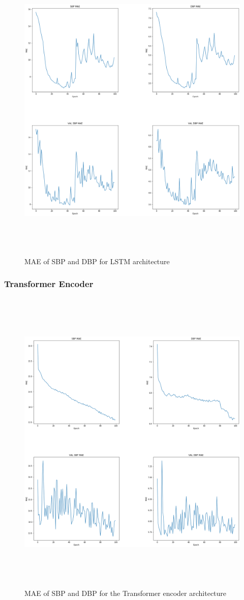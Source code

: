 \begin{figure}[H]
    \centering
    \includegraphics[width=15cm,height=15cm,keepaspectratio]{Results/lstm.png}
    \caption{MAE of SBP and DBP for LSTM architecture}
    \label{lstmResults}
\end{figure}


\subsubsection{Transformer Encoder}

\begin{figure}[H]
    \centering
    \includegraphics[width=15cm,height=15cm,keepaspectratio]{Results/encoder.png}
    \caption{MAE of SBP and DBP for the Transformer encoder architecture}
    \label{encoderResults}
\end{figure}
